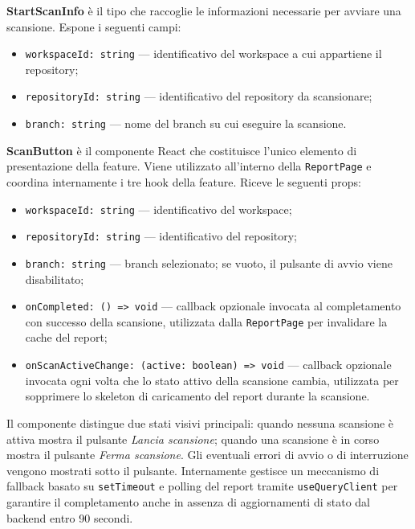 \documentclass[a4paper, 11pt]{article}
\newcounter{subsubsubsection}[subsubsection]
\newcounter{subsubsubsubsection}[subsubsubsection]
\begin{document}
\textbf{StartScanInfo} è il tipo che raccoglie le informazioni necessarie per avviare una
scansione. Espone i seguenti campi:
\begin{itemize}
  \item \texttt{workspaceId: string} — identificativo del workspace a cui appartiene il repository;
  \item \texttt{repositoryId: string} — identificativo del repository da scansionare;
  \item \texttt{branch: string} — nome del branch su cui eseguire la scansione.
\end{itemize}


\textbf{ScanButton} è il componente React che costituisce l'unico elemento di presentazione della
feature. Viene utilizzato all'interno della \texttt{ReportPage} e coordina internamente i tre
hook della feature. Riceve le seguenti props:
\begin{itemize}
  \item \texttt{workspaceId: string} — identificativo del workspace;
  \item \texttt{repositoryId: string} — identificativo del repository;
  \item \texttt{branch: string} — branch selezionato; se vuoto, il pulsante di avvio viene
        disabilitato;
  \item \texttt{onCompleted: () => void} — callback opzionale invocata al completamento con
        successo della scansione, utilizzata dalla \texttt{ReportPage} per invalidare la cache
        del report;
  \item \texttt{onScanActiveChange: (active: boolean) => void} — callback opzionale invocata
        ogni volta che lo stato attivo della scansione cambia, utilizzata per sopprimere lo
        skeleton di caricamento del report durante la scansione.
\end{itemize}
Il componente distingue due stati visivi principali: quando nessuna scansione è attiva mostra
il pulsante \textit{Lancia scansione}; quando una scansione è in corso mostra il pulsante
\textit{Ferma scansione}. Gli eventuali errori di avvio o di interruzione vengono mostrati
sotto il pulsante. Internamente gestisce un meccanismo di fallback basato su \texttt{setTimeout}
e polling del report tramite \texttt{useQueryClient} per garantire il completamento anche in
assenza di aggiornamenti di stato dal backend entro 90 secondi.

\end{document}
